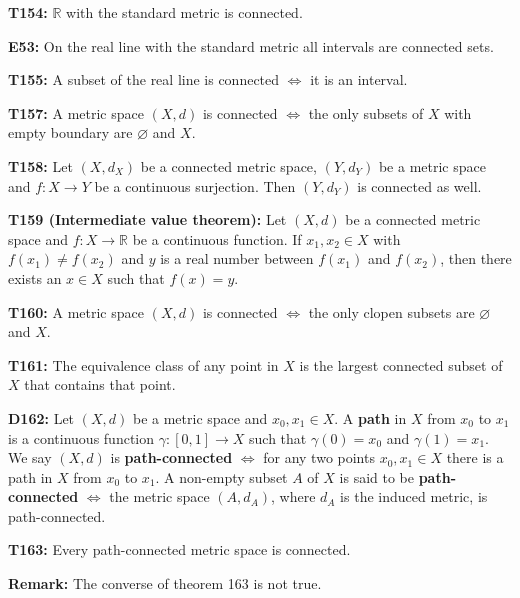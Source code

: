 \documentclass[twocolumn,10pt]{article}
\begin{document}
\textbf{T154:} $\mathbb{R}$ with the standard metric is connected.


\textbf{E53:} On the real line with the standard metric all intervals are connected sets.

\textbf{T155:} A subset of the real line is connected $\Leftrightarrow$ it is an interval.


\textbf{T157:} A metric space $(X,d)$ is connected $\Leftrightarrow$ the only subsets of $X$ with empty boundary are $\varnothing$ and $X$.

\textbf{T158:} Let $(X,d_X)$ be a connected metric space, $(Y,d_Y)$ be a metric space and $f:X\to Y$ be a continuous surjection. Then $(Y,d_Y)$ is connected as well.


\textbf{T159 (Intermediate value theorem):} Let $(X,d)$ be a connected metric space and $f:X\to\mathbb{R}$ be a continuous function. If $x_1,x_2\in X$ with $f(x_1)\neq f(x_2)$ and $y$ is a real number between $f(x_1)$ and $f(x_2)$, then there exists an $x\in X$ such that $f(x)=y$.

\textbf{T160:} A metric space $(X,d)$ is connected $\Leftrightarrow$ the only clopen subsets are $\varnothing$ and $X$.


\textbf{T161:} The equivalence class of any point in $X$ is the largest connected subset of $X$ that contains that point.


\textbf{D162:} Let $(X,d)$ be a metric space and $x_0,x_1\in X$. A \textbf{path} in $X$ from $x_0$ to $x_1$ is a continuous function $\gamma:[0,1]\to X$ such that $\gamma(0)=x_0$ and $\gamma(1)=x_1$. We say $(X,d)$ is \textbf{path-connected} $\Leftrightarrow$ for any two points $x_0,x_1\in X$ there is a path in $X$ from $x_0$ to $x_1$. A non-empty subset $A$ of $X$ is said to be \textbf{path-connected} $\Leftrightarrow$ the metric space $(A,d_A)$, where $d_A$ is the induced metric, is path-connected.

\textbf{T163:} Every path-connected metric space is connected.


\textbf{Remark:} The converse of theorem 163 is not true.
\end{document}
